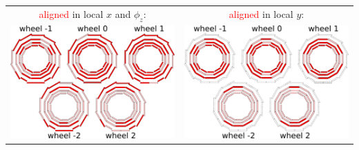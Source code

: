 \documentclass[compress]{beamer}
\begin{document}
\begin{frame}
\begin{center}
\begin{tabular}{c c}
\textcolor{red}{aligned} in local $x$ and $\phi_z$: & \textcolor{red}{aligned} in local $y$: \\
\includegraphics[width=0.4\linewidth]{aligned_rphi.pdf} & 
\includegraphics[width=0.4\linewidth]{aligned_z.pdf}
\end{tabular}
\end{center}
\end{frame}
\end{document}
